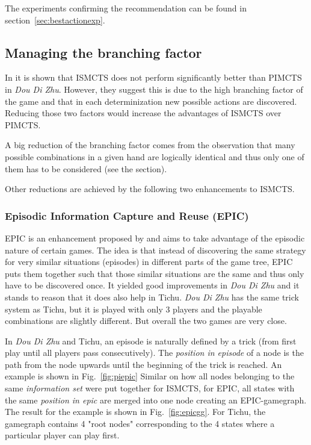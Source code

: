 The experiments confirming the recommendation can be found in section~\ref{sec:bestactionexp}.


\subsection{Managing the branching factor}
In \cite{ismcts} it is shown that ISMCTS does not perform significantly better than PIMCTS in \textit{Dou Di Zhu}. However, they suggest this is due to the high branching factor of the game and that in each determinization new possible actions are discovered. Reducing those two factors would increase the advantages of ISMCTS over PIMCTS.

A big reduction of the branching factor comes from the observation that many possible combinations in a given hand are logically identical and thus only one of them has to be considered (see the \textit{} section).

Other reductions are achieved by the following two enhancements to ISMCTS.

\subsubsection{Episodic Information Capture and Reuse (EPIC)}

EPIC is an enhancement proposed by \cite{whitehouse14} and aims to take advantage of the episodic nature of certain games. The idea is that instead of discovering the same strategy for very similar situations (episodes) in different parts of the game tree, EPIC puts them together such that those similar situations are the same and thus only have to be discovered once. \newline
It yielded good improvements in \textit{Dou Di Zhu} and it stands to reason that it does also help in Tichu.
\textit{Dou Di Zhu} has the same trick system as Tichu, but it is played with only 3 players and the playable combinations are slightly different. But overall the two games are very close.

In \textit{Dou Di Zhu} and Tichu, an episode is naturally defined by a trick (from first play until all players pass consecutively). The \textit{position in episode} of a node is the path from the node upwards until the beginning of the trick is reached. An example is shown in Fig.~\ref{fig:piepic}
Similar on how all nodes belonging to the same \textit{information set} were put together for ISMCTS, for EPIC, all states with the same \textit{position in epic} are merged into one node creating an EPIC-gamegraph. The result for the example is shown in Fig.~\ref{fig:epicgg}.
For Tichu, the gamegraph contains 4 "root nodes" corresponding to the 4 states where a particular player can play first. 

